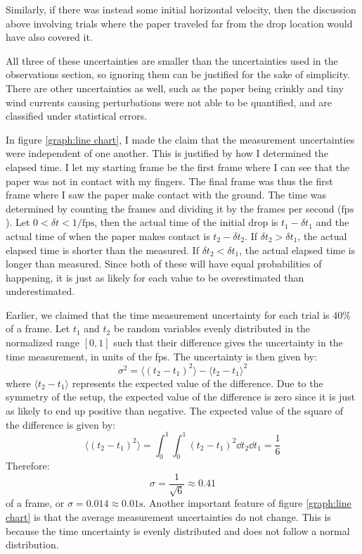 \documentclass[%
 reprint,
 amsmath,amssymb,
 aps,
]{revtex4-2}
\begin{document}
Similarly, if there was instead some initial horizontal velocity, then the discussion above involving trials where the paper traveled far from the drop location would have also covered it.

All three of these uncertainties are smaller than the uncertainties used in the observations section, so ignoring them can be justified for the sake of simplicity. There are other uncertainties as well, such as the paper being crinkly and tiny wind currents causing perturbations were not able to be quantified, and are classified under statistical errors.

In figure \ref{graph:line chart}, I made the claim that the measurement uncertainties were independent of one another. This is justified by how I determined the elapsed time. I let my starting frame be the first frame where I can see that the paper was not in contact with my fingers. The final frame was thus the first frame where I saw the paper make contact with the ground. The time was determined by counting the frames and dividing it by the frames per second ($\text{fps}$). Let $0<\delta t < 1/\text{fps}$, then the actual time of the initial drop is $t_1-\delta t_1$ and the actual time of when the paper makes contact is $t_2-\delta t_2$. If $\delta t_2 > \delta t_1$, the actual elapsed time is shorter than the measured. If $\delta t_2 < \delta t_1$, the actual elapsed time is longer than measured. Since both of these will have equal probabilities of happening, it is just as likely for each value to be overestimated than underestimated.

Earlier, we claimed that the time measurement uncertainty for each trial is $40\%$ of a frame. Let $t_1$ and $t_2$ be random variables evenly distributed in the normalized range $[0,1]$ such that their difference gives the uncertainty in the time measurement, in units of the fps. The uncertainty is then given by:
\begin{equation}
    \sigma^2 = \langle (t_2-t_1)^2 \rangle - \langle t_2-t_1 \rangle^2
    \label{eq:}
\end{equation}
where $\langle t_2-t_1 \rangle$ represents the expected value of the difference. Due to the symmetry of the setup, the expected value of the difference is zero since it is just as likely to end up positive than negative. The expected value of the square of the difference is given by:
\begin{equation}
    \langle (t_2-t_1)^2 \rangle = \int_0^1\int_0^1 (t_2-t_1)^2 \dd{t_2}\dd{t_1} = \frac{1}{6}
    \label{eq:}
\end{equation}
Therefore:
\begin{equation}
    \sigma = \frac{1}{\sqrt{6}} \approx 0.41
    \label{eq:}
\end{equation}
of a frame, or $\sigma=0.014 \approx 0.01\si{\second}$. Another important feature of figure \ref{graph:line chart} is that the average measurement uncertainties do not change. This is because the time uncertainty is evenly distributed and does not follow a normal distribution.
\end{document}
